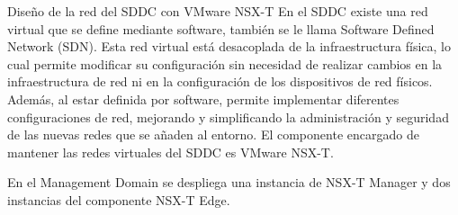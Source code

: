 

\begin{subsubsection}{Diseño de la red del SDDC con VMware NSX-T}
    En el SDDC existe una red virtual que se define mediante software, también se le llama Software Defined Network (SDN). Esta red virtual está desacoplada de la infraestructura física, lo cual permite modificar su configuración sin necesidad de realizar cambios en la infraestructura de red ni en la configuración de los dispositivos de red físicos. Además, al estar definida por software, permite implementar diferentes configuraciones de red, mejorando y simplificando la administración y seguridad de las nuevas redes que se añaden al entorno. El componente encargado de mantener las redes virtuales del SDDC es VMware NSX-T.

    
    En el Management Domain se despliega una instancia de NSX-T Manager y dos instancias del componente NSX-T Edge.


\end{subsubsection}
